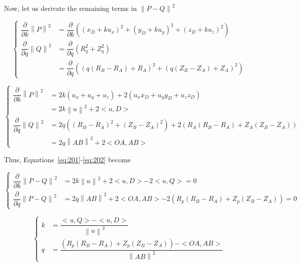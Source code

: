 \documentclass[a4paper,11pt,twoside,titlepage,openright]{book}
\numberwithin{equation}{section}
\newcommand{\norm}[1]{\left\lVert#1\right\rVert}
\begin{document}
Now, let us derivate the remaining terms in $\norm{P-Q}^2$

$$
\begin{cases}{}
\dfrac{\partial}{\partial k} \norm{P}^2 &= \dfrac{\partial}{\partial k} \left(  (x_D + k u_x)^2 + (y_D + k u_y)^2 + (z_D + k u_z)^2 \right)\\[0.2cm]
\label{eq:eq207}
\dfrac{\partial}{\partial q} \norm{Q}^2 &= \dfrac{\partial}{\partial q} \left( R_q^2 + Z_q^2\right) \\[0.2cm]
&= \dfrac{\partial}{\partial q} \left( (q(R_B-R_A)+R_A)^2 + (q(Z_B-Z_A)+Z_A)^2\right)
\label{eq:eq208}
\end{cases}
$$

$$
\begin{cases}{}
\dfrac{\partial}{\partial k} \norm{P}^2 &= 2k(u_x + u_y + u_z) + 2(u_x x_D + u_y y_D + u_z z_D)\\[0.2cm]
& = 2k \norm{u}^2 + 2 <u, D>\\[0.2cm]
\dfrac{\partial}{\partial q} \norm{Q}^2 &= 2q((R_B - R_A)^2 + (Z_B - Z_A)^2) + 2(R_A(R_B-R_A) + Z_A(Z_B-Z_A))\\[0.2cm]
& = 2q \norm{AB}^2 + 2 <OA, AB>
\end{cases}
$$

Thus, Equations~\eqref{eq:201}-\eqref{eq:202} become

$$
\begin{cases}{}
\dfrac{\partial}{\partial k} \norm{P-Q}^2 &= 2k \norm{u}^2 + 2 <u, D> - 2 <u, Q> = 0\\[0.2cm]
\dfrac{\partial}{\partial q} \norm{P-Q}^2 &=2q \norm{AB}^2 + 2 <OA, AB> - 2(R_p (R_B - R_A) +Z_p (Z_B - Z_A)) = 0
\end{cases}
$$

$$
\begin{cases}{}
k &= \dfrac{<u, Q> - <u, D>}{\norm{u}^2}\\[0.2cm]
q  &=  \dfrac{(R_p (R_B - R_A) +Z_p (Z_B - Z_A)) - <OA, AB>}{\norm{AB}^2}
\end{cases}
$$
\end{document}
